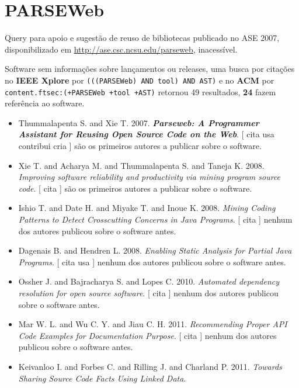 \section{PARSEWeb}

Query para apoio e sugestão de reuso de bibliotecas
publicado no ASE 2007,
disponibilizado em \url{http://ase.csc.ncsu.edu/parseweb},
inacessível.

Software sem informações sobre lançamentos ou releases,
uma busca por citações no {\bf IEEE Xplore} por
\texttt{(((PARSEWeb) AND tool) AND AST)}
e no {\bf ACM} por
\texttt{content.ftsec:(+PARSEWeb +tool +AST)}
retornou
49 resultados,
{\bf 24} fazem referência ao software.

\begin{itemize}
\item Thummalapenta S. and Xie T.
      2007.
        \textbf{\textit{ Parseweb: A Programmer Assistant for Reusing Open Source Code on the Web}}.
      [
          cita
          usa
          contribui
          cria
      ]
são os primeiros autores a publicar sobre o software.
\item Xie T. and Acharya M. and Thummalapenta S. and Taneja K.
      2008.
        \textit{ Improving software reliability and productivity via mining program source code}.
      [
          cita
      ]
são os primeiros autores a publicar sobre o software.
\item Ishio T. and Date H. and Miyake T. and Inoue K.
      2008.
        \textit{ Mining Coding Patterns to Detect Crosscutting Concerns in Java Programs}.
      [
          cita
      ]
nenhum dos autores publicou sobre o software antes.
\item Dagenais B. and Hendren L.
      2008.
        \textit{ Enabling Static Analysis for Partial Java Programs}.
      [
          cita
          usa
      ]
nenhum dos autores publicou sobre o software antes.
\item Ossher J. and Bajracharya S. and Lopes C.
      2010.
        \textit{ Automated dependency resolution for open source software}.
      [
          cita
      ]
nenhum dos autores publicou sobre o software antes.
\item Mar W. L. and Wu C. Y. and Jiau C. H.
      2011.
        \textit{ Recommending Proper API Code Examples for Documentation Purpose}.
      [
          cita
      ]
nenhum dos autores publicou sobre o software antes.
\item Keivanloo I. and Forbes C. and Rilling J. and Charland P.
      2011.
        \textit{ Towards Sharing Source Code Facts Using Linked Data}.

\end{itemize}
